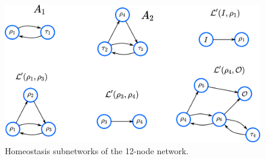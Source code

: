 \begin{figure}[H]
    \centering
    \includegraphics[scale=0.5]{figs/example_sec2_subnets.png}
    \caption{Homeostasis subnetworks of the 12-node network.}
    \label{fig:fig2}
\end{figure}
